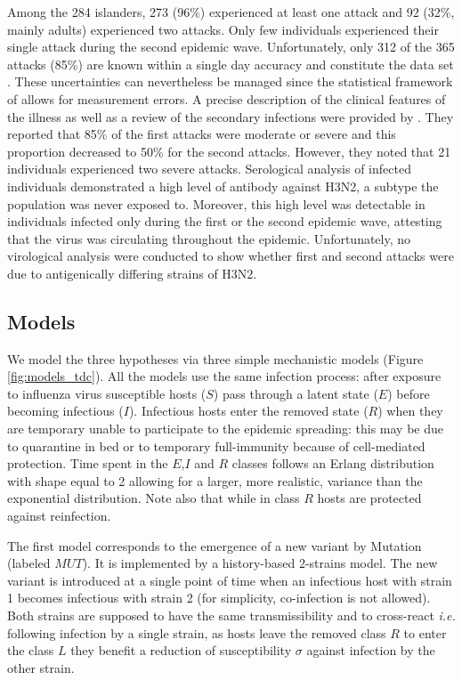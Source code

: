 Among the 284 islanders, 273 (96\%) experienced at least one attack
and 92 (32\%, mainly adults) experienced two attacks. Only few
individuals experienced their single attack during the second epidemic
wave. Unfortunately, only 312 of the 365 attacks (85\%) are known
within a single day accuracy and constitute the data set
\citep{Mathews2007}. These uncertainties can nevertheless be managed
since the statistical framework of \citet{Ionides2006} allows for
measurement errors. A precise description of the clinical features of
the illness as well as a review of the secondary infections were
provided by \citet{Mantle1973}. They reported that 85\% of the first
attacks were moderate or severe and this proportion decreased to 50\%
for the second attacks. However, they noted that 21 individuals
experienced two severe attacks. Serological analysis of infected
individuals demonstrated a high level of antibody against H3N2, a
subtype the population was never exposed to. Moreover, this high level
was detectable in individuals infected only during the first or the
second epidemic wave, attesting that the virus was circulating
throughout the epidemic. Unfortunately, no virological analysis were
conducted to show whether first and second attacks were due to
antigenically differing strains of H3N2.

\subsection{Models}

We model the three hypotheses via three simple mechanistic models
(Figure \ref{fig:models_tdc}). All the models use the same infection
process: after exposure to influenza virus susceptible hosts ($S$)
pass through a latent state ($E$) before becoming infectious
($I$). Infectious hosts enter the removed state ($R$) when they are
temporary unable to participate to the epidemic spreading: this may be
due to quarantine in bed or to temporary full-immunity because of
cell-mediated protection. Time spent in the $E$,$I$ and $R$ classes
follows an Erlang distribution with shape equal to 2 allowing for a
larger, more realistic, variance than the exponential
distribution. Note also that while in class $R$ hosts are protected
against reinfection.
 
The first model corresponds to the emergence of a new variant by
Mutation (labeled $MUT$). It is implemented by a history-based
2-strains model. The new variant is introduced at a single point of
time when an infectious host with strain 1 becomes infectious with
strain 2 (for simplicity, co-infection is not allowed). Both strains
are supposed to have the same transmissibility and to cross-react
\textit{i.e.} following infection by a single strain, as hosts leave
the removed class $R$ to enter the class $L$ they benefit a reduction
of susceptibility $\sigma$ against infection by the other strain.

